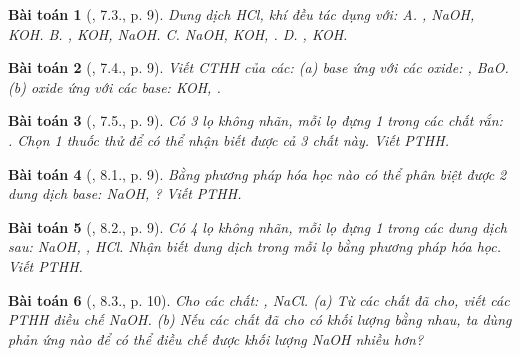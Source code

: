 \documentclass{article}
\newtheorem{baitoan}{Bài toán}
\begin{document}
\begin{baitoan}[\cite{SGK_Hoa_Hoc_9}, 7.3., p. 9]
	Dung dịch {\rm HCl}, khí {\rm{}} đều tác dụng với: {\sf A.} {\rm{}, NaOH, KOH}. {\sf B.} {\rm{}, KOH, NaOH}. {\sf C.} {\rm NaOH, KOH, }. {\sf D.} {\rm{}, KOH}.
\end{baitoan}

\begin{baitoan}[\cite{SGK_Hoa_Hoc_9}, 7.4., p. 9]
	Viết CTHH của các: (a) base ứng với các oxide: {\rm{}, BaO}. (b) oxide ứng với các base: {\rm KOH, }.
\end{baitoan}

\begin{baitoan}[\cite{SGK_Hoa_Hoc_9}, 7.5., p. 9]
	Có 3 lọ không nhãn, mỗi lọ đựng 1 trong các chất rắn: {\rm{}}. Chọn 1 thuốc thử để có thể nhận biết được cả 3 chất này. Viết {\rm PTHH}.
\end{baitoan}

\begin{baitoan}[\cite{SGK_Hoa_Hoc_9}, 8.1., p. 9]
	Bằng phương pháp hóa học nào có thể phân biệt được 2 dung dịch base: {\rm NaOH, }? Viết PTHH.
\end{baitoan}

\begin{baitoan}[\cite{SGK_Hoa_Hoc_9}, 8.2., p. 9]
	Có 4 lọ không nhãn, mỗi lọ đựng 1 trong các dung dịch sau: {\rm NaOH, , HCl}. Nhận biết dung dịch trong mỗi lọ bằng phương pháp hóa học. Viết {\rm PTHH}.
\end{baitoan}

\begin{baitoan}[\cite{SGK_Hoa_Hoc_9}, 8.3., p. 10]
	Cho các chất: {\rm{}, NaCl}. (a) Từ các chất đã cho, viết các PTHH điều chế {\rm NaOH}. (b) Nếu các chất đã cho có khối lượng bằng nhau, ta dùng phản ứng nào để có thể điều chế được khối lượng {\rm NaOH} nhiều hơn?
\end{baitoan}
\end{document}

